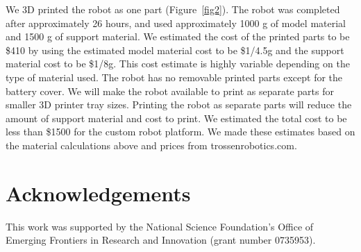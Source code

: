 \documentclass[letterpaper]{article}
\begin{document}
We 3D printed the robot as one part (Figure~\ref{fig2}). The robot was
completed after approximately 26 hours, and used approximately 1000 g
of model material and 1500 g of support material. We estimated the
cost of the printed parts to be \$410 by using the estimated model
material cost to be \$1/4.5g and the support material cost to be
\$1/8g. This cost estimate is highly variable depending on the type of
material used. The robot has no removable printed parts except for the
battery cover. We will make the robot available to print as separate
parts for smaller 3D printer tray sizes. Printing the robot as
separate parts will reduce the amount of support material and cost to
print. We estimated the total cost to be less than \$1500 for the
custom robot platform. We made these estimates based on the material
calculations above and prices from trossenrobotics.com.

\begin{table}[h]
\vskip 0.25cm
\caption{Estimated total cost. A specifiic parts list is on our website \citep{WEB}.}
\end{table}



\section{Acknowledgements}

This work was supported by the National Science Foundation's Office of
Emerging Frontiers in Research and Innovation (grant number 0735953).


\footnotesize


\end{document}
